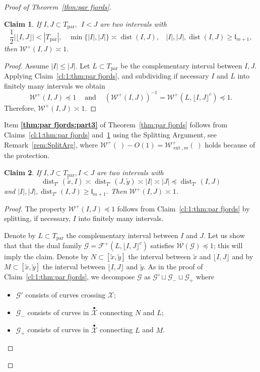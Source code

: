 \documentclass{amsart}
\renewcommand{\sp}{{\ \ }}
\newcommand{\1}{{\mathbb 1 }}
\newcommand{\upbullet}[1]{\overset{\bullet}{ #1}{}}
\newcommand{\FamG}{{\mathcal G}}
\newcommand{\ext}{{\operatorname{ext}}}
\newcommand{\Fam}{{\mathcal F}}
\newcommand{\Width}{{\mathcal W}}
\newcommand\XX{\mathcal{X}}
\newcommand{\length}{{\mathfrak l}}
\newcommand\parab{{\operatorname{par}}}
\newtheorem{claim8}{Claim}
\theoremstyle{remark}
\numberwithin{equation}{section}
\theoremstyle{definition}
\newcommand{\dist}{\operatorname{dist}}
\begin{document}
\begin{proof}[Proof of Theorem~\ref{thm:par fjords}]
\begin{claim8} 
\label{cl:2:thm:par fjords}
If $I, J\subset T_\parab,\sp  I<J$ are two intervals with \[\frac 12|\lfloor I,J\rfloor | < |T_\parab|,\sp\sp\min\{|I|,|J|\}\asymp \dist(I,J),\sp\sp |I|, |J|,\dist(I,J)\ge \length_{m+1},\] then $\Width^+(I,J)\asymp 1$. 
\end{claim8}
\begin{proof}
Assume $|I|\le |J|$. Let $L\subset T_\parab$ be the complementary interval between $I,J$. Applying Claim~\ref{cl:1:thm:par fjords}, and subdividing if necessary $I$ and $L$ into finitely many intervals we obtain
\[\Width^+(I,J)\preceq 1\sp\sp\text{ and }\sp\sp \left(\Width^+(I,J)\right)^{-1}= \Width^+(L,  \lfloor I, J\rfloor^c) \preceq 1.\]
Therefore, $\Width^+(I,J)\asymp 1$.
\end{proof}

Item {\bf \ref{thm:par fjords:part3}} of Theorem~\ref{thm:par fjords} follows from Claims~\ref{cl:1:thm:par fjords} and~\ref{cl:2:thm:par fjords} using the Splitting Argument, see Remark~\ref{rem:SplitArg}, where $\Width^+(\ )-O(1)=\Width^+_{\ext, m}(\ )$ holds because of the protection.




\begin{claim8} 
\label{cl:3:thm:par fjords}
If $I, J\subset T_\parab, I<J$ are two intervals with
\begin{equation}
\label{eq:cl:3:thm:par fjords}
 \dist_{T'}(\tilde x,I) \asymp \dist_{T'}(J,\tilde y) \asymp |I| \asymp |J|\preceq \dist_{T'}(I,J)
\end{equation}
and $|I|, |J|,\dist_{T'}(I,J)\ge \length_{m+1}$. Then $\Width^+(I,J)\asymp 1$.
\end{claim8}
\begin{proof}
The property $\Width^+(I,J)\preceq  1$ follows from Claim~\ref{cl:1:thm:par fjords} by splitting, if necessary, $I$ into finitely many intervals. 


Denote by $L\subset T_\parab$ the complementary interval between $I$ and $J.$ Let us show that that the dual family $\FamG=\Fam^+(L , \lfloor I, J \rfloor^c)$ satisfies $\Width(\FamG)\preceq 1$; this will imply the claim. Denote by $N\subset [\tilde x, \tilde y]$ the interval between $\tilde x $ and $\lfloor I, J \rfloor$ and by $M\subset [\tilde x, \tilde y]$ the interval between $\lfloor I, J \rfloor$ and $\tilde y $. As in the proof of Claim~\ref{cl:1:thm:par fjords}, we decompose $\FamG$ as $\FamG'\sqcup \FamG_-\sqcup \FamG_+$ where
\begin{itemize}
\item $\FamG'$ consists of curves crossing $\XX$;
\item $\FamG_-$ consists of curves in $\upbullet \XX$ connecting $N$ and $L$;
\item $\FamG_+$ consists of curves in $\upbullet \XX$ connecting $L$ and $M$.
\end{itemize}



\end{proof}
\end{proof}
\end{document}

